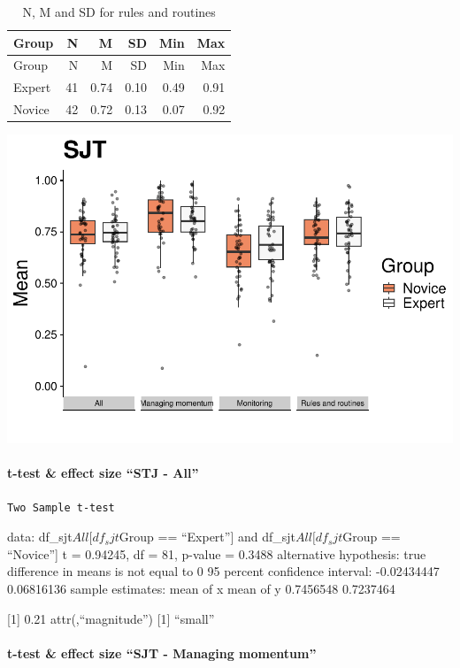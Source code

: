 \documentclass[
]{article}
\begin{document}
\begin{longtable}[]{@{}lrrrrr@{}}
\caption{N, M and SD for rules and routines}\tabularnewline
\toprule\noalign{}
Group & N & M & SD & Min & Max \\
\midrule\noalign{}
\endfirsthead
\toprule\noalign{}
Group & N & M & SD & Min & Max \\
\midrule\noalign{}
\endhead
\bottomrule\noalign{}
\endlastfoot
Expert & 41 & 0.74 & 0.10 & 0.49 & 0.91 \\
Novice & 42 & 0.72 & 0.13 & 0.07 & 0.92 \\
\end{longtable}

\includegraphics{expertise_2024_09_26_no_outlierdetection_MK_files/figure-latex/sjt-1.pdf}

\paragraph{t-test \& effect size ``STJ -
All''}\label{t-test-effect-size-stj---all}

\begin{verbatim}
Two Sample t-test
\end{verbatim}

data: df\_sjt\(All[df_sjt\)Group == ``Expert''{]} and
df\_sjt\(All[df_sjt\)Group == ``Novice''{]} t = 0.94245, df = 81,
p-value = 0.3488 alternative hypothesis: true difference in means is not
equal to 0 95 percent confidence interval: -0.02434447 0.06816136 sample
estimates: mean of x mean of y 0.7456548 0.7237464

{[}1{]} 0.21 attr(,``magnitude'') {[}1{]} ``small''

\paragraph{t-test \& effect size ``SJT - Managing
momentum''}\label{t-test-effect-size-sjt---managing-momentum}
\end{document}
